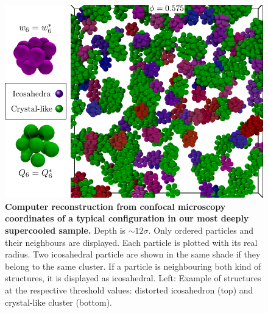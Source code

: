 \begin{figure}
\begin{center}
\includegraphics{generate_figures-figure4.pdf}
\end{center}
\caption{{\bf Computer reconstruction from confocal microscopy coordinates of a typical configuration in our most deeply supercooled sample.} Depth is $\sim 12\sigma$. Only ordered particles and their neighbours are displayed. Each particle is plotted with its real radius. Two icosahedral particle are shown in the same shade if they belong to the same cluster. If a particle is neighbouring both kind of structures, it is displayed as icosahedral. Left: Example of structures at the respective threshold values: distorted icosahedron (top) and crystal-like cluster (bottom).}
	\label{fig:3D}
\end{figure}

